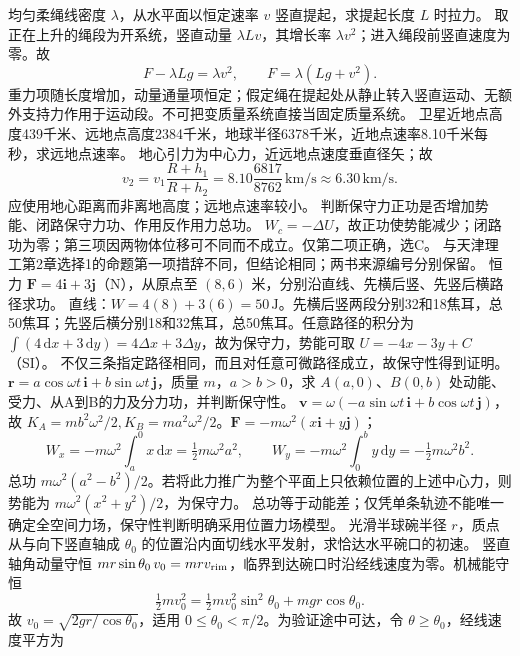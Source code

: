 \problemtext 均匀柔绳线密度 $\lambda$，从水平面以恒定速率 $v$ 竖直提起，求提起长度 $L$ 时拉力。
\workings 取正在上升的绳段为开系统，竖直动量 $\lambda Lv$，其增长率 $\lambda v^2$；进入绳段前竖直速度为零。故
\[
F-\lambda Lg=\lambda v^2,\qquad F=\lambda(Lg+v^2).
\]
\crosscheck 重力项随长度增加，动量通量项恒定；假定绳在提起处从静止转入竖直运动、无额外支持力作用于运动段。不可把变质量系统直接当固定质量系统。
\problemtext 卫星近地点高度439千米、远地点高度2384千米，地球半径6378千米，近地点速率8.10千米每秒，求远地点速率。
\workings 地心引力为中心力，近远地点速度垂直径矢；故
\[
v_2=v_1\frac{R+h_1}{R+h_2}
=8.10\frac{6817}{8762}\,\mathrm{km/s}\approx6.30\,\mathrm{km/s}.
\]
\crosscheck 应使用地心距离而非离地高度；远地点速率较小。
\problemtext 判断保守力正功是否增加势能、闭路保守力功、作用反作用力总功。
\workings $W_c=-\Delta U$，故正功使势能减少；闭路功为零；第三项因两物体位移可不同而不成立。仅第二项正确，选C。
\crosscheck 与天津理工第2章选择1的命题第一项措辞不同，但结论相同；两书来源编号分别保留。
\problemtext 恒力 $\bm F=4\bm i+3\bm j$（N），从原点至 $(8,6)$ 米，分别沿直线、先横后竖、先竖后横路径求功。
\workings 直线：$W=4(8)+3(6)=50\,\mathrm J$。先横后竖两段分别32和18焦耳，总50焦耳；先竖后横分别18和32焦耳，总50焦耳。任意路径的积分为 $\int(4\,\mathrm dx+3\,\mathrm dy)=4\Delta x+3\Delta y$，故为保守力，势能可取 $U=-4x-3y+C$（SI）。
\crosscheck 不仅三条指定路径相同，而且对任意可微路径成立，故保守性得到证明。
\problemtext $\bm r=a\cos\omega t\,\bm i+b\sin\omega t\,\bm j$，质量 $m$，$a>b>0$，求 $A(a,0)$、$B(0,b)$ 处动能、受力、从A到B的力及分力功，并判断保守性。
\workings $\bm v=\omega(-a\sin\omega t\,\bm i+b\cos\omega t\,\bm j)$，故 $K_A=mb^2\omega^2/2,K_B=ma^2\omega^2/2$。$\bm F=-m\omega^2(x\bm i+y\bm j)$；
\[
W_x=-m\omega^2\int_a^0 x\,\mathrm dx=\tfrac12m\omega^2a^2,\qquad
W_y=-m\omega^2\int_0^b y\,\mathrm dy=-\tfrac12m\omega^2b^2.
\]
总功 $m\omega^2(a^2-b^2)/2$。若将此力推广为整个平面上只依赖位置的上述中心力，则势能为 $m\omega^2(x^2+y^2)/2$，为保守力。
\crosscheck 总功等于动能差；仅凭单条轨迹不能唯一确定全空间力场，保守性判断明确采用位置力场模型。
\problemtext 光滑半球碗半径 $r$，质点从与向下竖直轴成 $\theta_0$ 的位置沿内面切线水平发射，求恰达水平碗口的初速。
\workings 竖直轴角动量守恒 $mr\sin\theta_0\,v_0=mr v_{\rm rim}$，临界到达碗口时沿经线速度为零。机械能守恒
\[
\tfrac12mv_0^2=\tfrac12mv_0^2\sin^2\theta_0+mgr\cos\theta_0.
\]
故 $v_0=\sqrt{2gr/\cos\theta_0}$，适用 $0\le\theta_0<\pi/2$。为验证途中可达，令 $\theta\ge\theta_0$，经线速度平方为
